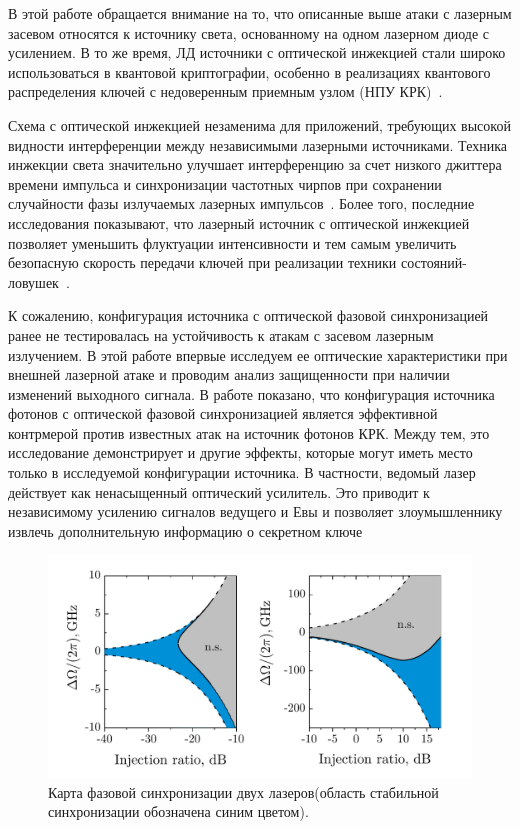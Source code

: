 В этой работе обращается внимание на то, что описанные выше атаки с лазерным засевом относятся к источнику света, основанному на одном лазерном диоде с усилением. В то же время, ЛД источники с оптической инжекцией стали широко использоваться в квантовой криптографии, особенно в реализациях квантового распределения ключей с недоверенным приемным узлом (НПУ КРК)~\cite{wei2020,woodward2021}.

Схема с оптической инжекцией незаменима для приложений, требующих высокой видности интерференции между независимыми лазерными источниками. Техника инжекции света значительно улучшает интерференцию за счет низкого джиттера времени импульса и синхронизации частотных чирпов при сохранении случайности фазы излучаемых лазерных импульсов~\cite{comandar2016}. Более того, последние исследования показывают, что лазерный источник с оптической инжекцией позволяет уменьшить флуктуации интенсивности и тем самым увеличить безопасную скорость передачи ключей при реализации техники состояний-ловушек~\cite{xie2019}. %
 
К сожалению, конфигурация источника с оптической фазовой синхронизацией ранее не тестировалась на устойчивость к атакам с засевом лазерным излучением. В этой работе впервые исследуем ее оптические характеристики при внешней лазерной атаке и проводим анализ защищенности при наличии изменений выходного сигнала. В работе показано, что конфигурация источника фотонов с оптической фазовой синхронизацией является эффективной контрмерой против известных атак на источник фотонов КРК. Между тем, это исследование демонстрирует и другие эффекты, которые могут иметь место только в исследуемой конфигурации источника. В частности, ведомый лазер действует как ненасыщенный оптический усилитель. Это приводит к независимому усилению сигналов ведущего и Евы и позволяет злоумышленнику извлечь дополнительную информацию о секретном ключе
\begin{figure}
\includegraphics{images/StabilityDiagramsFreq.pdf}
\caption{Карта фазовой синхронизации двух лазеров(область стабильной синхронизации обозначена синим цветом).}
\label{fig:injection}
\end{figure}
